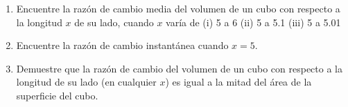 \item 
\begin{enumerate}
    \item[(a)] Encuentre la razón de cambio media del volumen de un cubo con respecto a la longitud $x$ de su lado, cuando $x$ varía de
    (i) 5 a 6 \quad (ii) 5 a 5.1 \quad (iii) 5 a 5.01
    \item[(b)] Encuentre la razón de cambio instantánea cuando $x = 5$.
    \item[(c)] Demuestre que la razón de cambio del volumen de un cubo con respecto a la longitud de su lado (en cualquier $x$) es igual a la mitad del área de la superficie del cubo.
\end{enumerate}
